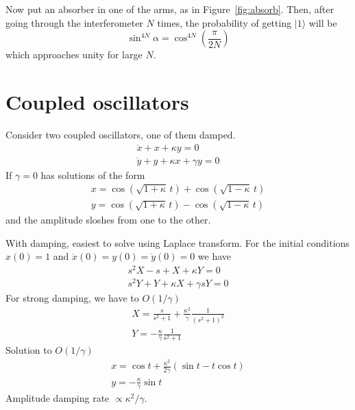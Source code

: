 \documentclass[12pt,aps,prb,preprint]{revtex4}
\def\ket#1{|#1\rangle}
\begin{document}
Now put an absorber in one of the arms, as in Figure~\ref{fig:absorb}.
Then, after going through the interferometer $N$ times, the
probability of getting $\ket1$ will be
\begin{equation}
\sin^{4N}\alpha = \cos^{4N} \left(\frac\pi{2N}\right)
\end{equation}
which approaches unity for large $N$.

\section{Coupled oscillators}

Consider two coupled oscillators, one of them damped.
\begin{equation}
\begin{array}{l}
\ddot x + x + \kappa y = 0 \\
\ddot y + y + \kappa x + \gamma y = 0
\end{array}
\end{equation}
If $\gamma=0$ has solutions of the form
\begin{equation}
\begin{array}{l}
x = \cos(\sqrt{1+\kappa}\,t) + \cos(\sqrt{1-\kappa}\,t)  \\
y = \cos(\sqrt{1+\kappa}\,t) - \cos(\sqrt{1-\kappa}\,t)
\end{array}
\end{equation}
and the amplitude sloshes from one to the other.

With damping, easiest to solve using Laplace transform. For the
initial conditions $x(0)=1$ and $\dot x(0) = y(0) = \dot y(0) = 0$ we
have
\begin{equation}
\begin{array}{l}
s^2 X - s + X + \kappa Y = 0 \\
s^2 Y + Y + \kappa X + \gamma s Y = 0
\end{array}
\end{equation}
For strong damping, we have to $O(1/\gamma)$
\begin{equation}
\begin{array}{l}
\displaystyle
X = \frac s{s^2+1} + \frac{\kappa^2}\gamma \frac1{(s^2+1)^2} \\
\displaystyle
Y = -\frac\kappa\gamma \frac1{s^2+1}
\end{array}
\end{equation}
Solution to $O(1/\gamma)$
\begin{equation}
\begin{array}{l}
\displaystyle
x = \cos t + \frac{\kappa^2}{2\gamma} (\sin t - t\cos t) \\
\displaystyle
y = -\frac\kappa\gamma \sin t
\end{array}
\end{equation}
Amplitude damping rate $\propto\kappa^2/\gamma$.
\end{document}
